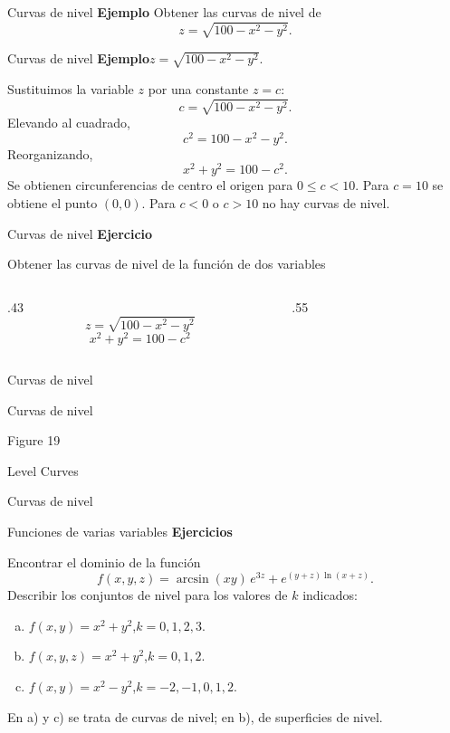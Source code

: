 \documentclass[original_version/main.tex]{subfiles}
\begin{document}
\begin{frame}{Curvas de nivel}
\textbf{Ejemplo}
\vfill
Obtener las curvas de nivel de
\[z=\sqrt{100-x^2-y^2}.\]
\vfill
\end{frame}
\begin{frame}{Curvas de nivel}
\small\textbf{Ejemplo}\quad $z=\sqrt{100-x^2-y^2}$.
\medskip

Sustituimos la variable $z$ por una constante $z=c$:
\[c=\sqrt{100-x^2-y^2}.\]
Elevando al cuadrado,
\[c^2=100-x^2-y^2.\]
Reorganizando,
\[x^2+y^2=100-c^2.\]
Se obtienen circunferencias de centro el origen para $0\le c<10$. Para $c=10$ se obtiene el punto $(0,0)$. Para $c<0$ o $c>10$ no hay curvas de nivel.
\end{frame}
\begin{frame}{Curvas de nivel}
\textbf{Ejercicio}\par
Obtener las curvas de nivel de la función de dos variables
\begin{columns}[c]
\begin{column}{.43\textwidth}
\[z=\sqrt{100-x^2-y^2}\]
\[x^2+y^2=100-c^2\]
\end{column}
\begin{column}{.55\textwidth}\end{column}
\end{columns}
\end{frame}
\begin{frame}{Curvas de nivel}
\end{frame}
\begin{frame}{Curvas de nivel}
\begin{center}\scriptsize Figure 19\end{center}
\end{frame}
\begin{frame}{Level Curves}
\end{frame}
\begin{frame}{Curvas de nivel}
\end{frame}
\begin{frame}{Funciones de varias variables}
\small\textbf{Ejercicios}
\medskip

Encontrar el dominio de la función
\[f(x,y,z)=\arcsin(xy)\,e^{3z}+e^{(y+z)\ln(x+z)}.\]
Describir los conjuntos de nivel para los valores de $k$ indicados:
\begin{enumerate}[a)]
\item $f(x,y)=x^2+y^2$,\quad $k=0,1,2,3$.
\item $f(x,y,z)=x^2+y^2$,\quad $k=0,1,2$.
\item $f(x,y)=x^2-y^2$,\quad $k=-2,-1,0,1,2$.
\end{enumerate}
En a) y c) se trata de curvas de nivel; en b), de superficies de nivel.
\end{frame}
\end{document}

